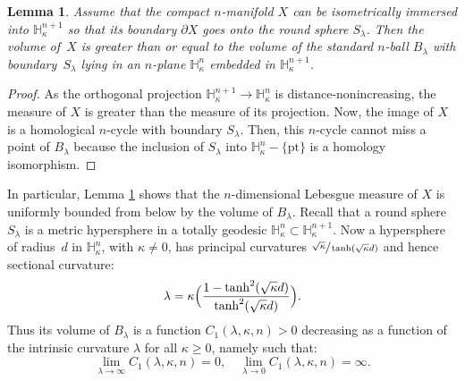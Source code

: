 \documentclass[10pt]{amsart}
\newcommand{\pt}{\mathrm{pt}}
\newtheorem{lemma}[theorem]{Lemma}
\theoremstyle{definition}
\theoremstyle{remark}
\numberwithin{equation}{section}
\begin{document}
\begin{lemma}\label{caps}
Assume that the compact $n$-manifold $X$ can be isometrically immersed into
$\mathbb H_{\kappa}^{n+1}$ so that its boundary $\partial X$ goes onto
the round sphere $S_{\lambda}$. Then the volume of~$X$
is greater than or equal to the volume of the
standard $n$-ball $B_{\lambda}$ with boundary~$S_{\lambda}$
lying in an $n$-plane
$\mathbb H_{\kappa}^{n}$ embedded in $\mathbb H_{\kappa}^{n+1}$.
\end{lemma}
\begin{proof}
As the orthogonal projection $\mathbb H_{\kappa}^{n+1}\to \mathbb H_{\kappa}^{n}$
is distance-nonincreasing, the measure of $X$ is greater
than the measure of its projection. Now, the image of $X$ is a homological
$n$-cycle with boundary $S_{\lambda}$. Then, this $n$-cycle cannot miss a point of
$B_{\lambda}$ because the inclusion of $S_{\lambda}$ into $\mathbb H_{\kappa}^{n}-\{\pt\}$
is a homology isomorphism.
\end{proof}

In particular, Lemma \ref{caps} shows that the
$n$-dimensional Lebesgue measure of $X$ is uniformly bounded
from below by the volume of $B_{\lambda}$. Recall that a round sphere~$S_{\lambda}$ is a metric hypersphere
in a totally geodesic $\mathbb H^n_{\kappa}\subset \mathbb H^{n+1}_{\kappa}$. Now a hypersphere
of \hbox{radius}~$d$ in $\mathbb H^n_{\kappa}$, with $\kappa \neq 0$, has principal curvatures
$\sfrac{\sqrt{\kappa}}{\tanh(\sqrt{\kappa}d)}$ and hence sectional curvature:
\[ \lambda =\kappa \Bigl (\frac{1- \tanh^2(\sqrt{\kappa}d)}{\tanh^2(\sqrt{\kappa}d)}\Bigr).\]
Thus its volume of $B_{\lambda}$ is a function
$C_1(\lambda,\kappa,n) >0$ decreasing as a function of
the intrinsic curvature $\lambda$ for all $\kappa\geq 0$, namely such that:
\[\lim_{\lambda\to \infty}C_1(\lambda,\kappa,n)=0, \quad
\lim_{\lambda\to 0}C_1(\lambda,\kappa,n)=\infty. \]
\end{document}
